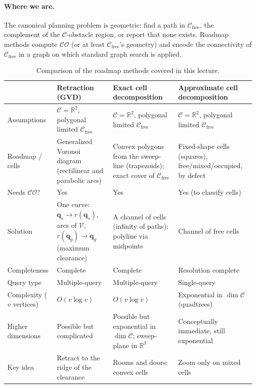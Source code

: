 \documentclass[11pt,a4paper]{article}
\newcommand{\Cspace}{\mathcal{C}}
\newcommand{\Cfree}{\mathcal{C}_{\mathrm{free}}}
\newcommand{\CO}{\mathcal{CO}}
\newcommand{\Vor}{\mathcal{V}}
\newcommand{\R}{\mathbb{R}}
\newcommand{\qs}{\boldsymbol{q}_s}
\newcommand{\qg}{\boldsymbol{q}_g}
\theoremstyle{definition}
\theoremstyle{plain}
\theoremstyle{remark}
\begin{document}
\paragraph{Where we are.} The canonical planning problem is geometric: find a path in $\Cfree$, the complement of the $\Cspace$-obstacle region, or report that none exists. Roadmap methods compute $\CO$ (or at least $\Cfree$'s geometry) and encode the connectivity of $\Cfree$ in a graph on which standard graph search is applied.

\begin{table}[h]
\centering
\small
\renewcommand{\arraystretch}{1.25}
\begin{tabularx}{\textwidth}{>{\raggedright\arraybackslash}p{2.6cm}>{\raggedright\arraybackslash}X>{\raggedright\arraybackslash}X>{\raggedright\arraybackslash}X}
\toprule
 & \textbf{Retraction} (GVD) & \textbf{Exact cell decomposition} & \textbf{Approximate cell decomposition}\\
\midrule
Assumptions & $\Cspace=\R^2$, polygonal limited $\Cfree$ & $\Cspace=\R^2$, polygonal limited $\Cfree$ & $\Cspace=\R^2$, polygonal limited $\Cfree$\\
Roadmap / cells & Generalized Voronoi diagram (rectilinear and parabolic arcs) & Convex polygons from the sweep-line (trapezoids); exact cover of $\Cfree$ & Fixed-shape cells (squares), free/mixed/occupied, by defect\\
Needs $\CO$? & Yes & Yes & Yes (to classify cells)\\
Solution & One curve: $\qs\to r(\qs)$, arcs of $\Vor$, $r(\qg)\to\qg$ (maximum clearance) & A channel of cells (infinity of paths); polyline via midpoints & Channel of free cells\\
Completeness & Complete & Complete & Resolution complete\\
Query type & Multiple-query & Multiple-query & Single-query\\
Complexity ($v$ vertices) & $O(v\log v)$ & $O(v\log v)$ & Exponential in $\dim\Cspace$ (quadtrees)\\
Higher dimensions & Possible but complicated & Possible but exponential in $\dim\Cspace$; sweep-plane in $\R^3$ & Conceptually immediate, still exponential\\
Key idea & Retract to the ridge of the clearance & Rooms and doors: convex cells & Zoom only on mixed cells\\
\bottomrule
\end{tabularx}
\caption{Comparison of the roadmap methods covered in this lecture.}
\end{table}
\end{document}
